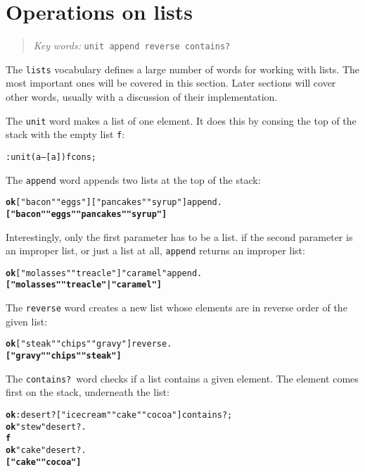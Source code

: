 \documentclass[english]{book}
\newcommand{\chapkeywords}[1]{%
\begin{quote}
\emph{Key words:} \texttt{#1}
\end{quote}
}
\begin{document}
\section{Operations on lists}

\chapkeywords{unit append reverse contains?}

The \texttt{lists} vocabulary defines a large number of words for working with lists. The most important ones will be covered in this section. Later sections will cover other words, usually with a discussion of their implementation.

The \texttt{unit} word makes a list of one element. It does this by consing the top of the stack with the empty list \texttt{f}:

\begin{alltt}
: unit ( a -- {[} a {]} ) f cons ;
\end{alltt}

The \texttt{append} word appends two lists at the top of the stack:

\begin{alltt}
\textbf{ok} {[} "bacon" "eggs" {]} {[} "pancakes" "syrup" {]} append .
\textbf{{[} "bacon" "eggs" "pancakes" "syrup" {]}}
\end{alltt}

Interestingly, only the first parameter has to be a list. if the second parameter
is an improper list, or just a list at all, \texttt{append} returns an improper list:

\begin{alltt}
\textbf{ok} {[} "molasses" "treacle" {]} "caramel" append .
\textbf{{[} "molasses" "treacle" | "caramel" {]}}
\end{alltt}

The \texttt{reverse} word creates a new list whose elements are in reverse order of the given list:

\begin{alltt}
\textbf{ok} {[} "steak" "chips" "gravy" {]} reverse .
\textbf{{[} "gravy" "chips" "steak" {]}}
\end{alltt}

The \texttt{contains?}~word checks if a list contains a given element. The element comes first on the stack, underneath the list:

\begin{alltt}
\textbf{ok} : desert? {[} "ice cream" "cake" "cocoa" {]} contains? ;
\textbf{ok} "stew" desert? .
\textbf{f}
\textbf{ok} "cake" desert? .
\textbf{{[} "cake" "cocoa" {]}}
\end{alltt}
\end{document}
